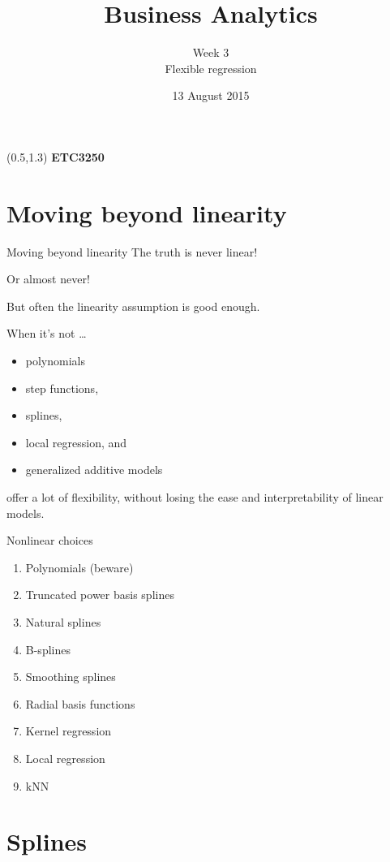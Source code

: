 \documentclass[14pt]{beamer}
\title[3. Flexible regression]{Business Analytics}
\author{Week 3\\ Flexible regression}
\date{13 August 2015}
\begin{document}
\begin{frame}[plain]{}
\maketitle
\begin{textblock}{11}(0.5,1.3){\color{white}\large
\textbf{ETC3250}}
\end{textblock}
\end{frame}

\section{Moving beyond linearity}

\begin{frame}{Moving beyond linearity}
The truth is never linear!\pause

Or almost never!\pause

But often the linearity assumption is good enough.\pause

When it's not \dots
\begin{itemize}
\item polynomials
\item step functions,
\item splines,
\item local regression, and
\item generalized additive models
\end{itemize}
offer a lot of flexibility, without losing the ease and
interpretability of linear models.

\end{frame}
\begin{frame}{Nonlinear choices}
\begin{enumerate}
\item Polynomials (beware)
\item Truncated power basis splines
\item Natural splines
\item B-splines
\item Smoothing splines
\item Radial basis functions
\item Kernel regression
\item Local regression
\item kNN
\end{enumerate}
\end{frame}

\section{Splines}
\end{document}
